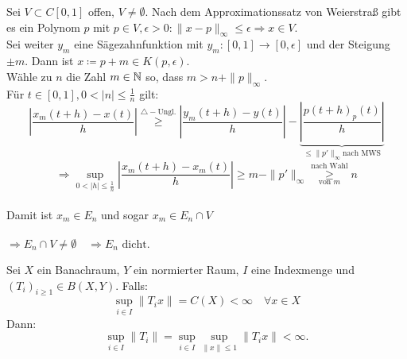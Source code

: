 \begin{beweis}
\begin{enumerate}[label=\roman*\upshape)]
			Sei $V \subset C[0, 1]$ offen, $V \neq \emptyset$. Nach dem Approximationssatz von Weierstra{\ss} gibt es ein Polynom $p$ mit $p \in V, \epsilon > 0: \| x - p \|_{\infty} \leq \epsilon \Rightarrow x \in V$. \\
			Sei weiter $y_{m}$ eine Sägezahnfunktion mit $y_{m}: [0, 1] \rightarrow [0, \epsilon]$ und der Steigung $\pm m$.
			Dann ist $x \coloneqq p + {m} \in K(p, \epsilon)$. \\
			Wähle zu $n$ die Zahl $m \in \mathbb{N}$ so, dass $m > n + \| p \|_{\infty}$. \\
			Für $t \in [0, 1], 0 < | n | \leq \frac{1}{n}$ gilt:
			\[ \left| \frac{x_{m}(t + h) - x(t)}{h} \right| \overset{\triangle-\text{Ungl.}}{\geq} \left| \frac{y_{m}(t + h) - y(t)}{h} \right| - \underbrace{\left| \frac{p(t + h) _ p(t)}{h} \right|}_{\leq{\| p' \|_{\infty}} \text{nach MWS}}  \]
			\[ \Rightarrow \sup_{0 < |h| \leq \frac{1}{n}} \left| \frac{x_{m}(t + h) - x_{m}(t)}{h} \right| \geq m - \| p' \|_{\infty} \overset{\text{nach Wahl}}{\underset{\text{von }m}{\geq}} n \] \\
			Damit ist $x_{m} \in E_{n}$ und sogar $x_{m} \in E_{n} \cap V$ \\ \\
			$\Rightarrow E_{n} \cap V \neq \emptyset \quad \Rightarrow E_{n} \text{ dicht.}$
	\end{enumerate}	
\end{beweis}


\begin{satz} \label{satz:9.5-Banach-Steinhaus} 
	Sei $X$ ein Banachraum, $Y$ ein normierter Raum, $I$ eine Indexmenge und $(T_{i})_{i \geq 1} \in B(X, Y)$.
	Falls: 
	\[ \sup_{i \in I} \| T_{i} x \| = C(X) < \infty \quad \forall x \in X \]
	Dann:
	\[ \sup_{i \in I} \| T_{i} \| = \sup_{i \in I} \sup_{\| x \| \leq 1} \| T_{i} x \| < \infty. \]
\end{satz}

